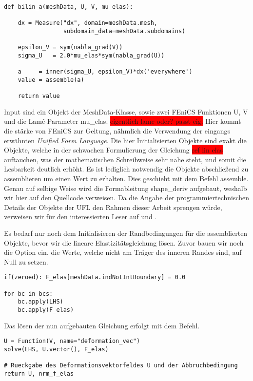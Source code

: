 \begin{lstlisting}
def bilin_a(meshData, U, V, mu_elas):

    dx = Measure("dx", domain=meshData.mesh, 
                 subdomain_data=meshData.subdomains)

    epsilon_V = sym(nabla_grad(V))
    sigma_U   = 2.0*mu_elas*sym(nabla_grad(U))

    a     = inner(sigma_U, epsilon_V)*dx('everywhere')
    value = assemble(a)

    return value

\end{lstlisting}
Input sind ein Objekt der \textsf{MeshData}-Klasse, sowie zwei FEniCS Funktionen \textsf{U, V} und die Lamé-Parameter \textsf{mu\_elas}. \colorbox{red}{eigentlich lame oder? passt eig.} Hier kommt die stärke von FEniCS zur Geltung, nähmlich die Verwendung der eingangs erwähnten \textit{Unified Form Language}. Die hier Initialisierten Objekte sind exakt die Objekte, welche in der schwachen Formulierung der Gleichung \colorbox{red}{ref lin elas} auftauchen, was der mathematischen Schreibweise sehr nahe steht, und somit die Lesbarkeit deutlich erhöht. Es ist lediglich notwendig die Objekte abschließend zu assemblieren um einen Wert zu erhalten. Dies geschieht mit dem Befehl \textsf{assemble}. Genau auf selbige Weise wird die Formableitung \textsf{shape\_deriv} aufgebaut, weshalb wir hier auf den Quellcode verweisen. Da die Angabe der programmiertechnischen Details der Objekte der UFL den Rahmen dieser Arbeit sprengen würde, verweisen wir für den interessierten Leser auf \cite{fenics} und \cite{Unifiedformlanguage}.

Es bedarf nur noch dem Initialisieren der Randbedingungen für die assemblierten Objekte, bevor wir die lineare Elastizitätsgleichung lösen. Zuvor bauen wir noch die Option ein, die Werte, welche nicht am Träger des inneren Randes sind, auf Null zu setzen.

\begin{lstlisting}
if(zeroed): F_elas[meshData.indNotIntBoundary] = 0.0

for bc in bcs:
    bc.apply(LHS)
    bc.apply(F_elas)
\end{lstlisting}

Das lösen der nun aufgebauten Gleichung erfolgt mit dem Befehl.
\begin{lstlisting}
U = Function(V, name="deformation_vec")
solve(LHS, U.vector(), F_elas)

# Rueckgabe des Deformationsvektorfeldes U und der Abbruchbedingung
return U, nrm_f_elas

\end{lstlisting}

